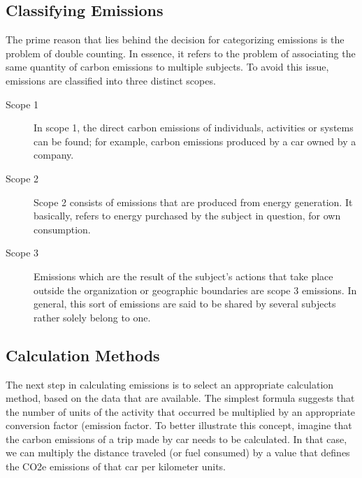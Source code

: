 \subsection{Classifying Emissions}
The prime reason that lies behind the decision for categorizing emissions is the problem of double counting. In essence, it refers to the problem of associating the same quantity of carbon emissions to multiple subjects\cite{reference23:25}. To avoid this issue, emissions are classified into three distinct scopes.

\begin{description}
  \item[Scope 1]
        In scope 1, the direct carbon emissions of individuals, activities or systems can be found; for example, carbon emissions produced by a car owned by a company.
  \item[Scope 2]
        Scope 2 consists of emissions that are produced from energy generation. It basically, refers to energy purchased by the subject in question, for own consumption.
  \item[Scope 3]
        Emissions which are the result of the subject's actions that take place outside the organization or geographic boundaries are scope 3 emissions. In general, this sort of emissions are said to be shared by several subjects rather solely belong to one.
\end{description}


\subsection{Calculation Methods}

The next step in calculating emissions is to select an appropriate calculation method, based on the data that are available. The simplest formula suggests that the number of units of the activity that occurred be multiplied by an appropriate conversion factor (emission factor\cite{reference25}. To better illustrate this concept, imagine that the carbon emissions of a trip made by car needs to be calculated. In that case, we can multiply the distance traveled (or fuel consumed) by a value that defines the CO2e emissions of that car per kilometer units.

